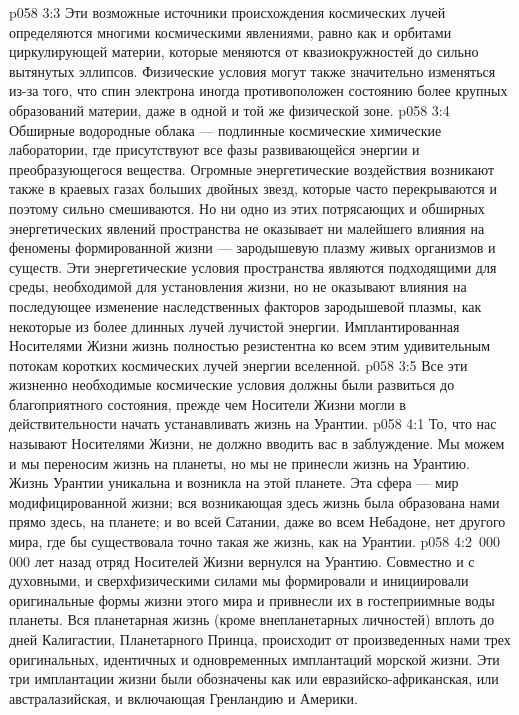 \vs p058 3:3 Эти возможные источники происхождения космических лучей определяются многими космическими явлениями, равно как и орбитами циркулирующей материи, которые меняются от квазиокружностей до сильно вытянутых эллипсов. Физические условия могут также значительно изменяться из\hyp{}за того, что спин электрона иногда противоположен состоянию более крупных образований материи, даже в одной и той же физической зоне.
\vs p058 3:4 Обширные водородные облака --- подлинные космические химические лаборатории, где присутствуют все фазы развивающейся энергии и преобразующегося вещества. Огромные энергетические воздействия возникают также в краевых газах больших двойных звезд, которые часто перекрываются и поэтому сильно смешиваются. Но ни одно из этих потрясающих и обширных энергетических явлений пространства не оказывает ни малейшего влияния на феномены формированной жизни --- зародышевую плазму живых организмов и существ. Эти энергетические условия пространства являются подходящими для среды, необходимой для установления жизни, но не оказывают влияния на последующее изменение наследственных факторов зародышевой плазмы, как некоторые из более длинных лучей лучистой энергии. Имплантированная Носителями Жизни жизнь полностью резистентна ко всем этим удивительным потокам коротких космических лучей энергии вселенной.
\vs p058 3:5 \pc Все эти жизненно необходимые космические условия должны были развиться до благоприятного состояния, прежде чем Носители Жизни могли в действительности начать устанавливать жизнь на Урантии.
\vs p058 4:1 То, что нас называют Носителями Жизни, не должно вводить вас в заблуждение. Мы можем и мы переносим жизнь на планеты, но мы не принесли жизнь на Урантию. Жизнь Урантии уникальна и возникла на этой планете. Эта сфера --- мир модифицированной жизни; вся возникающая здесь жизнь была образована нами прямо здесь, на планете; и во всей Сатании, даже во всем Небадоне, нет другого мира, где бы существовала точно такая же жизнь, как на Урантии.
\vs p058 4:2 \,000\,000 лет назад отряд Носителей Жизни вернулся на Урантию. Совместно и с духовными, и сверхфизическими силами мы формировали и инициировали оригинальные формы жизни этого мира и привнесли их в гостеприимные воды планеты. Вся планетарная жизнь (кроме внепланетарных личностей) вплоть до дней Калигастии, Планетарного Принца, происходит от произведенных нами трех оригинальных, идентичных и одновременных имплантаций морской жизни. Эти три имплантации жизни были обозначены как  или евразийско\hyp{}африканская,  или австралазийская, и  включающая Гренландию и Америки.
